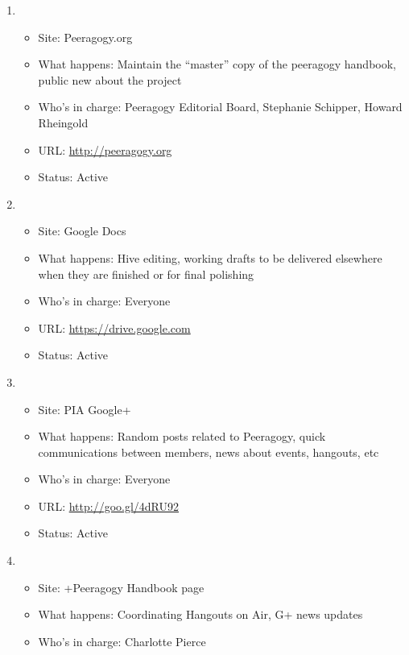 \begin{enumerate}
\item
  \begin{itemize}
  \itemsep1pt\parskip0pt
  \item
    Site: Peeragogy.org
  \item
    What happens: Maintain the ``master'' copy of the peeragogy
    handbook, public new about the project
  \item
    Who's in charge: Peeragogy Editorial Board, Stephanie Schipper,
    Howard Rheingold
  \item
    URL: \href{http://peeragogy.org}{http://peeragogy.org}
  \item
    Status: Active
  \end{itemize}
\item
  \begin{itemize}
  \itemsep1pt\parskip0pt
  \item
    Site: Google Docs
  \item
    What happens: Hive editing, working drafts to be delivered elsewhere
    when they are finished or for final polishing
  \item
    Who's in charge: Everyone
  \item
    URL: \href{https://drive.google.com}{https://drive.google.com}
  \item
    Status: Active
  \end{itemize}
\item
  \begin{itemize}
  \itemsep1pt\parskip0pt
  \item
    Site: PIA Google+
  \item
    What happens: Random posts related to Peeragogy, quick
    communications between members, news about events, hangouts, etc
  \item
    Who's in charge: Everyone
  \item
    URL: \href{http://goo.gl/4dRU92}{http://goo.gl/4dRU92}
  \item
    Status: Active
  \end{itemize}
\item
  \begin{itemize}
  \itemsep1pt\parskip0pt
  \item
    Site: +Peeragogy Handbook page
  \item
    What happens: Coordinating Hangouts on Air, G+ news updates
  \item
    Who's in charge: Charlotte Pierce

\end{itemize}
\end{enumerate}
